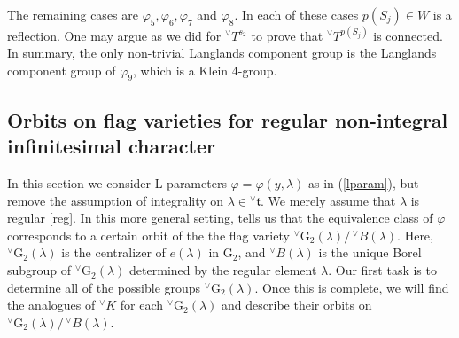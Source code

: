 \documentclass[a4paper, 11pt]{article}
\begin{document}
The remaining cases are $\varphi_{5}, \varphi_{6}, \varphi_{7}$ and
$\varphi_{8}$.  In each 
of these cases $p(S_{j}) \in W$ is a reflection.  One may argue as we did
for ${^\vee}T^{s_{2}}$ to prove that ${^\vee}T^{p(S_{j})}$ is
connected.  In summary, the only non-trivial Langlands component group
is the Langlands component group of $\varphi_{9}$, which is a Klein
4-group. 

\subsection{Orbits on flag varieties for regular non-integral infinitesimal
  character}\label{section:FlagNonIntegral} 
 
In this section we consider L-parameters $\varphi = 
\varphi(y,\lambda)$ as in (\ref{lparam}), but remove the assumption
of integrality on $\lambda \in {^\vee}\mathfrak{t}$.  We merely assume
that $\lambda$ is regular \ref{reg}.  In this more general setting,
\cite[Section 6]{ABV} tells us that  the
equivalence class of $\varphi$ corresponds to a certain orbit of the 
the flag variety ${^\vee}\mathrm{G}_{2}(\lambda)/ \,{^\vee}B(\lambda)$. Here,
${^\vee}\mathrm{G}_{2}(\lambda)$ is the centralizer of $e(\lambda)$ in
$\mathrm{G}_{2}$, and  ${^\vee}B(\lambda)$ is the unique Borel subgroup of
${^\vee}\mathrm{G}_{2}(\lambda)$ determined by the regular element
$\lambda$.  Our first task is to determine all of the possible groups
${^\vee}\mathrm{G}_{2}(\lambda)$.  Once this is complete, we will
find the analogues of ${^\vee}K$ for each
${^\vee}\mathrm{G}_{2}(\lambda)$ and describe their orbits on
${^\vee}\mathrm{G}_{2}(\lambda)/ \,{^\vee}B(\lambda)$.  
\end{document}

